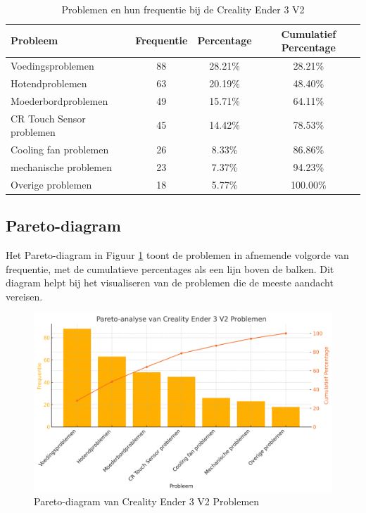 \documentclass{article}
\begin{document}
\begin{table}[h!]
    \centering
    \begin{tabular}{lccc}
        \toprule
        \textbf{Probleem} & \textbf{Frequentie} & \textbf{Percentage} & \textbf{Cumulatief Percentage} \\
        \midrule
        Voedingsproblemen         & 88  & 28.21\%   & 28.21\% \\
        Hotendproblemen           & 63  & 20.19\%   & 48.40\% \\
        Moederbordproblemen       & 49  & 15.71\%   & 64.11\% \\
        CR Touch Sensor problemen & 45  & 14.42\%    & 78.53\% \\
        Cooling fan problemen     & 26  & 8.33\%   & 86.86\% \\
        mechanische problemen     & 23   & 7.37\%    & 94.23\% \\
        Overige problemen         & 18   & 5.77\%    & 100.00\% \\
        \bottomrule
    \end{tabular}
    \caption{Problemen en hun frequentie bij de Creality Ender 3 V2}
    \label{tab:pareto}
\end{table}


\newpage
\subsection{Pareto-diagram}
Het Pareto-diagram in Figuur \ref{fig:pareto} toont de problemen in afnemende volgorde van frequentie, met de cumulatieve percentages als een lijn boven de balken. Dit diagram helpt bij het visualiseren van de problemen die de meeste aandacht vereisen.

\begin{figure}[H]
    \centering
    \includegraphics[width=\textwidth]{pareto_diagram.png} %
    \caption{Pareto-diagram van Creality Ender 3 V2 Problemen}
    \label{fig:pareto}
\end{figure}
\end{document}
